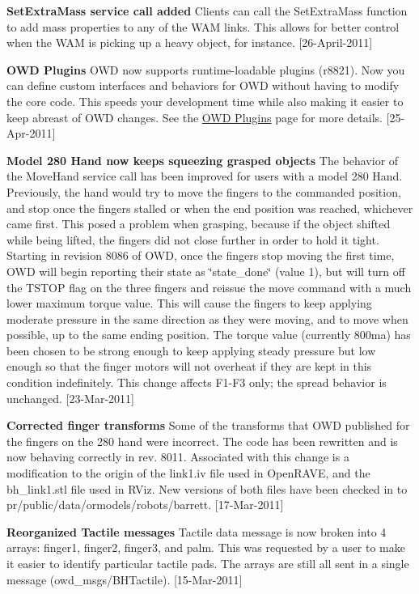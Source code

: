 {\bfseries Set\-Extra\-Mass service call added} Clients can call the Set\-Extra\-Mass function to add mass properties to any of the W\-A\-M links. This allows for better control when the W\-A\-M is picking up a heavy object, for instance. \mbox{[}26-\/\-April-\/2011\mbox{]}

{\bfseries O\-W\-D Plugins} O\-W\-D now supports runtime-\/loadable plugins (r8821). Now you can define custom interfaces and behaviors for O\-W\-D without having to modify the core code. This speeds your development time while also making it easier to keep abreast of O\-W\-D changes. See the \hyperlink{plugins}{O\-W\-D Plugins} page for more details. \mbox{[}25-\/\-Apr-\/2011\mbox{]}

{\bfseries Model 280 Hand now keeps squeezing grasped objects} The behavior of the Move\-Hand service call has been improved for users with a model 280 Hand. Previously, the hand would try to move the fingers to the commanded position, and stop once the fingers stalled or when the end position was reached, whichever came first. This posed a problem when grasping, because if the object shifted while being lifted, the fingers did not close further in order to hold it tight. Starting in revision 8086 of O\-W\-D, once the fingers stop moving the first time, O\-W\-D will begin reporting their state as \char`\"{}state\-\_\-done\char`\"{} (value 1), but will turn off the T\-S\-T\-O\-P flag on the three fingers and reissue the move command with a much lower maximum torque value. This will cause the fingers to keep applying moderate pressure in the same direction as they were moving, and to move when possible, up to the same ending position. The torque value (currently 800ma) has been chosen to be strong enough to keep applying steady pressure but low enough so that the finger motors will not overheat if they are kept in this condition indefinitely. This change affects F1-\/\-F3 only; the spread behavior is unchanged. \mbox{[}23-\/\-Mar-\/2011\mbox{]}

{\bfseries Corrected finger transforms} Some of the transforms that O\-W\-D published for the fingers on the 280 hand were incorrect. The code has been rewritten and is now behaving correctly in rev. 8011. Associated with this change is a modification to the origin of the link1.\-iv file used in Open\-R\-A\-V\-E, and the bh\-\_\-link1.\-stl file used in R\-Viz. New versions of both files have been checked in to pr/public/data/ormodels/robots/barrett. \mbox{[}17-\/\-Mar-\/2011\mbox{]}

{\bfseries Reorganized Tactile messages} Tactile data message is now broken into 4 arrays\-: finger1, finger2, finger3, and palm. This was requested by a user to make it easier to identify particular tactile pads. The arrays are still all sent in a single message (owd\-\_\-msgs/\-B\-H\-Tactile). \mbox{[}15-\/\-Mar-\/2011\mbox{]}

